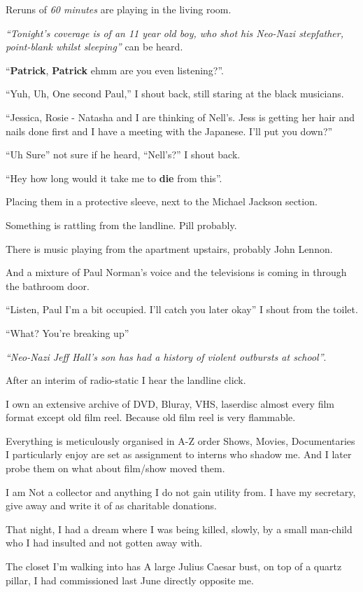 \documentclass[19pt,openany]{book}
\begin{document}
Reruns of \textit{60 minutes}
are playing in the living room.

\textit{``Tonight's coverage is of an
11 year old boy, who shot his Neo-Nazi
stepfather, point-blank whilst
sleeping''} can be heard.


``\textbf{Patrick}, \textbf{Patrick} ehmm are you even
listening?''.

``Yuh, Uh, One second Paul,'' I shout back,
still staring at the black musicians.

``Jessica, Rosie - Natasha and
I are thinking of Nell's.
Jess is getting her hair and nails
done first and I have
a meeting with the Japanese. I'll put you
down?''

``Uh Sure'' not sure if he heard,
``Nell's?'' I shout back.

``Hey how long would it take me to
\textbf{die} from
this''.

Placing them in a protective sleeve,
next to the Michael Jackson section.

Something is rattling
from the landline. Pill probably.

There is music playing
from the apartment upstairs,
probably John Lennon.

And a mixture of Paul Norman's
voice and the televisions
is coming in through the bathroom door.

``Listen, Paul I'm a bit occupied.
I'll catch you later okay'' I shout
from the toilet.

``What? You're breaking up''

\textit{``Neo-Nazi Jeff Hall's son has
had a history of violent outbursts at school''}.

After an interim of radio-static I
hear the landline click.

I own an extensive archive of DVD,
Bluray, VHS, laserdisc almost every
film format except old film reel.
Because old film reel is very
flammable.

Everything is meticulously
organised in A-Z order
Shows, Movies,
Documentaries I particularly
enjoy are set as assignment
to interns who shadow me. And I
later probe them on what about
film/show moved them.

I am Not a collector and
anything I do not gain utility from.
I have my secretary, give
away and write it
of as charitable donations.

That night, I had a dream
where I was being killed,
slowly, by a small man-child
who I had insulted and not gotten
away with.

The closet I'm walking into has
A large Julius Caesar bust, on top
of a quartz pillar, I had
commissioned last June  directly opposite
me.
\end{document}

